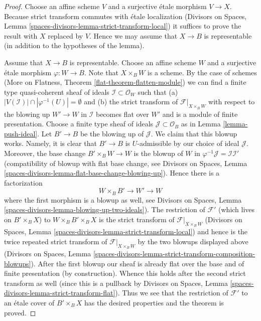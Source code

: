 \documentclass[10pt,a4paper]{amsart}
\theoremstyle{plain}
\theoremstyle{definition}
\theoremstyle{remark}
\numberwithin{equation}{subsection}
\begin{document}
\begin{proof}
Choose an affine scheme $V$ and a surjective \'etale morphism $V \to X$.
Because strict transform commutes with \'etale localization
(Divisors on Spaces, Lemma \ref{spaces-divisors-lemma-strict-transform-local})
it suffices to prove the result with $X$ replaced by $V$. Hence we
may assume that $X \to B$ is representable (in addition to the
hypotheses of the lemma).

\medskip\noindent
Assume that $X \to B$ is representable. Choose an affine scheme $W$ and a
surjective \'etale morphism $\varphi : W \to B$. Note that $X \times_B W$
is a scheme. By the case of schemes
(More on Flatness, Theorem \ref{flat-theorem-flatten-module})
we can find a finite type quasi-coherent sheaf of ideals
$\mathcal{I} \subset \mathcal{O}_W$ such that
(a) $|V(\mathcal{I})| \cap |\varphi^{-1}(U)| = \emptyset$ and (b)
the strict transform of $\mathcal{F}|_{X \times_B W}$ with respect
to the blowing up $W' \to W$ in $\mathcal{I}$ becomes flat over $W'$
and is a module of finite presentation. Choose a finite type sheaf of ideals
$\mathcal{J} \subset \mathcal{O}_B$ as in Lemma \ref{lemma-push-ideal}.
Let $B' \to B$ be the blowing up of $\mathcal{J}$. We claim that this
blowup works. Namely, it is clear that $B' \to B$ is $U$-admissible
by our choice of ideal $\mathcal{J}$. Moreover, the base change
$B' \times_B W \to W$ is the blowup of $W$ in
$\varphi^{-1}\mathcal{J} = \mathcal{I}\mathcal{I}'$
(compatibility of blowup with flat base change, see
Divisors on Spaces, Lemma
\ref{spaces-divisors-lemma-flat-base-change-blowing-up}).
Hence there is a factorization
$$
W \times_B B' \to W' \to W
$$
where the first morphism is a blowup as well, see
Divisors on Spaces, Lemma \ref{spaces-divisors-lemma-blowing-up-two-ideals}).
The restriction of $\mathcal{F}'$ (which lives on $B' \times_B X$)
to $W \times_B B' \times_B X$ is the strict transform of
$\mathcal{F}|_{X \times_B W}$
(Divisors on Spaces, Lemma \ref{spaces-divisors-lemma-strict-transform-local})
and hence is the twice repeated strict transform of
$\mathcal{F}|_{X \times_B W}$ by the two blowups displayed above
(Divisors on Spaces, Lemma
\ref{spaces-divisors-lemma-strict-transform-composition-blowups}).
After the first blowup our sheaf is already flat over
the base and of finite presentation (by construction). Whence this holds 
after the second strict transform as well (since this is a
pullback by Divisors on Spaces, Lemma
\ref{spaces-divisors-lemma-strict-transform-flat}).
Thus we see that the restriction of $\mathcal{F}'$
to an \'etale cover of $B' \times_B X$ has the desired properties
and the theorem is proved.
\end{proof}
\end{document}
